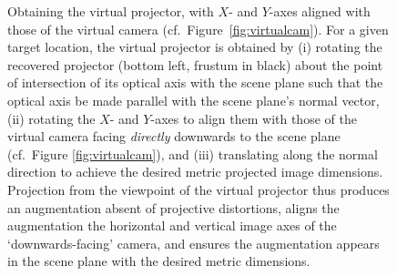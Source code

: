 \documentclass[review]{elsarticle}
\begin{document}
\begin{figure}[t]
    \centering
    \qquad
    \caption{Obtaining the virtual projector, with $X$- and $Y$-axes aligned with those of the virtual camera (cf.\ Figure~\ref{fig:virtualcam}). For a given target location, the virtual projector is obtained by (i) rotating the recovered projector (bottom left, frustum in black) about the point of intersection of its optical axis with the scene plane such that the optical axis be made parallel with the scene plane's normal vector, (ii) rotating the $X$- and $Y$-axes to align them with those of the virtual camera facing \textit{directly} downwards to the scene plane (cf.\ Figure \ref{fig:virtualcam}), and (iii) translating along the normal direction to achieve the desired metric projected image dimensions. Projection from the viewpoint of the virtual projector thus produces an augmentation absent of projective distortions, aligns the augmentation  the horizontal and vertical image axes of the `downwards-facing' camera, and ensures the augmentation appears in the scene plane with the desired metric dimensions.} %
    \label{fig:virtualproj}
\end{figure}
\end{document}
